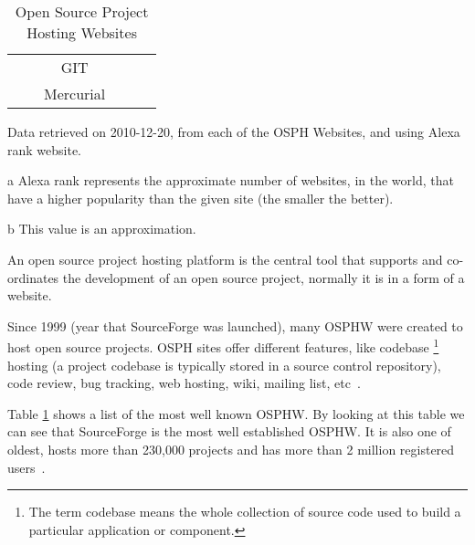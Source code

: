 \begin{table}[H]
\begin{threeparttable}
\begin{tabular}{|c|c|c|c|c|c|}
                         &              &GIT            &                    &                         &                       \\
                         &              &Mercurial      &                    &                         &                       \\\hline 
\end{tabular}
\begin{tablenotes}
  \item    Data retrieved on 2010-12-20, from each of the OSPH Websites, and using Alexa rank website.
  \item[a] Alexa rank represents the approximate number of websites, in the world, that have a higher popularity than the given site
           (the smaller the better).
  \item[b] This value is an approximation.
\end{tablenotes}
\end{threeparttable}
\caption{Open Source Project Hosting Websites}
\label{table:OSPHWebSites}
\end{table}

An open source project hosting platform is the central tool that supports and co-ordinates the development of an open source project,
 normally it is in a form of a website.

Since 1999 (year that SourceForge was launched), many OSPHW were created to host open source projects.
OSPH sites offer different features, 
like codebase \footnote{The term codebase means the whole collection of source code used to build a particular application or component.} 
hosting (a project codebase is typically stored in a source control repository), 
code review, bug tracking, web hosting, wiki, mailing list, etc~\cite{binkley2006animated}.

Table \ref{table:OSPHWebSites} shows a list of the most well known OSPHW.
By looking at this table we can see that SourceForge is the most well established OSPHW.
It is also one of oldest, 
hosts more than 230,000 projects and has more than 2 million registered users~\cite{christley2005collection}.

